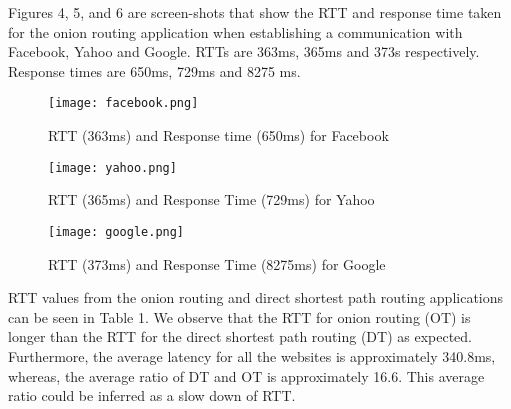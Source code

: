 \documentclass{article}
\begin{document}
\vspace{0.3 cm}

\noindent Figures 4, 5, and 6 are screen-shots that show the RTT and response time taken for the onion routing application when establishing a communication with Facebook, Yahoo  and Google. RTTs   are 363ms, 365ms and 373s respectively. Response times are 650ms, 729ms and 8275 ms. \\

\vspace{0.3 cm}

\begin{figure}[!ht]
	\label{fig:v}
    \centering
    \texttt{[image: facebook.png]}
    \caption{RTT (363ms) and Response time (650ms) for Facebook  }
\end{figure}

\begin{figure}[!ht]
\label{fig:vi}
    \centering
    \texttt{[image: yahoo.png]}
    \caption{RTT (365ms) and Response Time (729ms) for Yahoo  }
\end{figure}

\begin{figure}[!ht]
\label{fig:vii}
    \centering
    \texttt{[image: google.png]}
    \caption{RTT  (373ms)  and Response Time (8275ms) for Google }
\end{figure}


\noindent RTT values from the onion routing and direct shortest path routing applications can be seen in Table 1. We observe that the RTT for onion routing (OT) is longer than the RTT for the direct shortest path routing (DT) as expected. Furthermore, the average latency for all the websites is approximately 340.8ms, whereas, the average ratio of DT and OT is approximately 16.6. This average ratio could be inferred as a slow down of RTT. \\

\vspace{0.3 cm}
\end{document}
